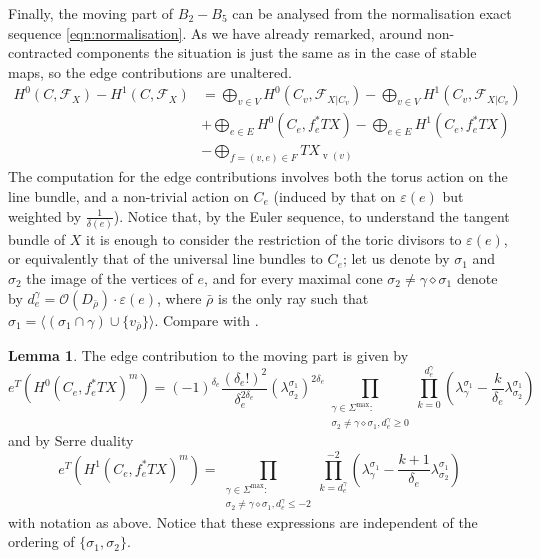 \documentclass[11pt]{amsart}
\newcommand{\OO}{\mathcal{O}}
\newcommand{\F}{\mathcal F}
\newcommand{\vv}{\operatorname{v}}
\theoremstyle{definition}
\newtheorem{lem}[thm]{Lemma}
\theoremstyle{definition}
\begin{document}
Finally, the moving part of $B_2-B_5$ can be analysed from the normalisation exact sequence \eqref{eqn:normalisation}. As we have already remarked, around non-contracted components the situation is just the same as in the case of stable maps, so the edge contributions are unaltered.
\begin{equation}\label{eqn:contrtoF}
\begin{aligned}
 H^0(C,\F_X)-H^1(C,\F_X) &= \bigoplus_{v\in V}H^0(C_v,\F_{X|C_v})-\bigoplus_{v\in V}H^1(C_v,\F_{X|C_v}) \\
 & + \bigoplus_{e\in E}H^0(C_e,f_e^*TX)-\bigoplus_{e\in E}H^1(C_e,f_e^*TX) \\
 & - \bigoplus_{f=(v,e)\in F} TX_{\vv(v)}
\end{aligned} 
\end{equation}
The computation for the edge contributions involves both the torus action on the line bundle, and a non-trivial action on $C_e$ (induced by that on $\varepsilon(e)$ but weighted by $\frac{1}{\delta(e)}$). Notice that, by the Euler sequence, to understand the tangent bundle of $X$ it is enough to consider the restriction of the toric divisors to $\varepsilon(e)$, or equivalently that of the universal line bundles to $C_e$; let us denote by $\sigma_1$ and $\sigma_2$ the image of the vertices of $e$, and for every maximal cone $\sigma_2\neq\gamma\diamond\sigma_1$ denote by $d^\gamma_e=\OO(D_{\bar{\rho}})\cdot \varepsilon(e)$, where $\bar{\rho}$ is the only ray such that $\sigma_1=\langle (\sigma_1\cap\gamma)\cup\{v_{\bar{\rho}}\}\rangle$. Compare with \cite[Lemma 7.4 and Corollary 7.5]{HolgerSpielberg}.
\begin{lem}
The edge contribution to the moving part is given by
\[
 e^T(H^0(C_e,f_e^*TX)^m)=(-1)^{\delta_e}\frac{(\delta_e!)^2}{\delta_e^{2\delta_e}}(\lambda^{\sigma_1}_{\sigma_2})^{2\delta_e}\prod_{\substack{\gamma\in\Sigma^{\text{max}}: \\ \sigma_2\neq\gamma\diamond\sigma_1,d^\gamma_e\geq0}}\prod_{k=0}^{d^\gamma_e}(\lambda^{\sigma_1}_{\gamma}-\frac{k}{\delta_e}\lambda^{\sigma_1}_{\sigma_2})
\]
and by Serre duality
\[
 e^T(H^1(C_e,f_e^*TX)^m)=\prod_{\substack{\gamma\in\Sigma^{\text{max}}: \\ \sigma_2\neq\gamma\diamond\sigma_1,d^\gamma_e\leq -2}}\prod_{k=d^\gamma_e}^{-2}(\lambda^{\sigma_1}_{\gamma}-\frac{k+1}{\delta_e}\lambda^{\sigma_1}_{\sigma_2})
\]
with notation as above. Notice that these expressions are independent of the ordering of $\{\sigma_1,\sigma_2\}$.
\end{lem}
\end{document}
